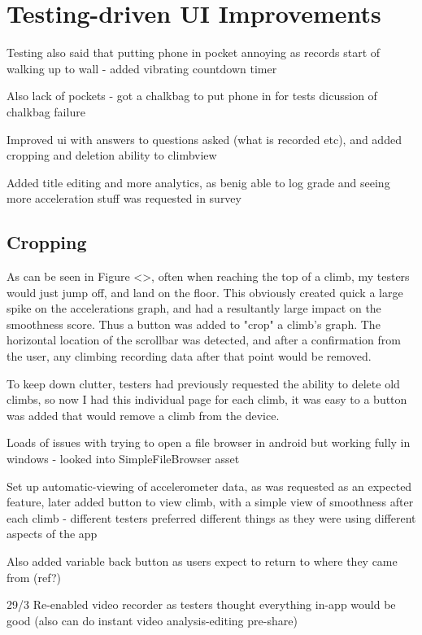 \section{Testing-driven UI Improvements}
Testing also said that putting phone in pocket annoying as records start of walking up to wall - added vibrating countdown timer


Also lack of pockets - got a chalkbag to put phone in for tests
dicussion of chalkbag failure


Improved ui with answers to questions asked (what is recorded etc), and added cropping and deletion ability to climbview


Added title editing and more analytics, as benig able to log grade and seeing more acceleration stuff was requested in survey


\subsection{Cropping}
As can be seen in Figure <>, often when reaching the top of a climb, my testers would just jump off, and land on the floor.
This obviously created quick a large spike on the accelerations graph, and had a resultantly large impact on the smoothness score.
Thus a button was added to "crop" a climb's graph.
The horizontal location of the scrollbar was detected, and after a confirmation from the user, any climbing recording data after that point would be removed.


To keep down clutter, testers had previously requested the ability to delete old climbs, so now I had this individual page for each climb, it was easy to a button was added that would remove a climb from the device.



Loads of issues with trying to open a file browser in android but working fully in windows - looked into SimpleFileBrowser asset


Set up automatic-viewing of accelerometer data, as was requested as an expected feature, later added button to view climb, with a simple view of smoothness after each climb - different testers preferred different things as they were using different aspects of the app

Also added variable back button as users expect to return to where they came from (ref?)



29/3
Re-enabled video recorder as testers thought everything in-app would be good (also can do instant video analysis-editing pre-share)

